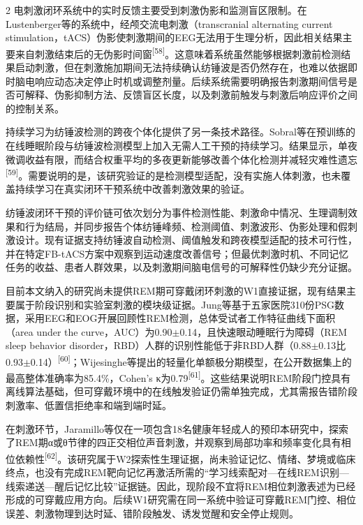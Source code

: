 \documentclass[UTF8,zihao=5,fontset=none]{ctexart}
\newcommand{\hei}{\CJKfamily{hei}}
\newcommand{\leveltwo}[1]{%
  \par\noindent{\hei\fontsize{10.5pt}{12.6pt}\selectfont\mdseries #1\par}}
\newcommand{\refcite}[1]{\nolinebreak[4]\textsuperscript{[#1]}}
\begin{document}
\begin{multicols}{2}
电刺激闭环系统中的实时反馈主要受到刺激伪影和监测盲区限制。在Lustenberger等的系统中，经颅交流电刺激（transcranial alternating current stimulation，tACS）伪影使刺激期间的EEG无法用于生理分析，因此相关结果主要来自刺激结束后的无伪影时间窗\refcite{58}。这意味着系统虽然能够根据刺激前检测结果启动刺激，但在刺激施加期间无法持续确认纺锤波是否仍然存在，也难以依据即时脑电响应动态决定停止时机或调整剂量。后续系统需要明确报告刺激期间信号是否可解释、伪影抑制方法、反馈盲区长度，以及刺激前触发与刺激后响应评价之间的控制关系。\par

持续学习为纺锤波检测的跨夜个体化提供了另一条技术路径。Sobral等在预训练的在线睡眠阶段与纺锤波检测模型上加入无需人工干预的持续学习。结果显示，单夜微调收益有限，而结合权重平均的多夜更新能够改善个体化检测并减轻灾难性遗忘\refcite{59}。需要说明的是，该研究验证的是检测模型适配，没有实施人体刺激，也未覆盖持续学习在真实闭环干预系统中改善刺激效果的验证。\par

纺锤波闭环干预的评价链可依次划分为事件检测性能、刺激命中情况、生理调制效果和行为结局，并同步报告个体纺锤峰频、检测阈值、刺激波形、伪影处理和假刺激设计。现有证据支持纺锤波自动检测、阈值触发和跨夜模型适配的技术可行性，并在特定FB-tACS方案中观察到运动速度改善信号；但最优刺激时机、不同记忆任务的收益、患者人群效果，以及刺激期间脑电信号的可解释性仍缺少充分证据。\par

\leveltwo{4.3 REM检测与相位刺激：证据与可穿戴缺口}

目前本文纳入的研究尚未提供REM期可穿戴闭环刺激的W1直接证据，现有结果主要属于阶段识别和实验室刺激的模块级证据。Jung等基于五家医院310份PSG数据，采用EEG和EOG开展回顾性REM检测，总体受试者工作特征曲线下面积（area under the curve，AUC）为0.90$\pm$0.14，且快速眼动睡眠行为障碍（REM sleep behavior disorder，RBD）人群的识别性能低于非RBD人群（0.88$\pm$0.13比0.93$\pm$0.14）\refcite{60}；Wijesinghe等提出的轻量化单额极分期模型，在公开数据集上的最高整体准确率为85.4\%，Cohen's κ为0.79\refcite{61}。这些结果说明REM阶段门控具有离线算法基础，但可穿戴环境中的在线触发验证仍需单独完成，尤其需报告错阶段刺激率、低置信拒绝率和端到端时延。\par

在刺激环节，Jaramillo等仅在一项包含18名健康年轻成人的预印本研究中，探索了REM期α或θ节律的四正交相位声音刺激，并观察到局部功率和频率变化具有相位依赖性\refcite{62}。该研究属于W2探索性生理证据，尚未验证记忆、情绪、梦境或临床终点，也没有完成REM靶向记忆再激活所需的“学习线索配对—在线REM识别—线索递送—醒后记忆比较”证据链。因此，现阶段不宜将REM相位刺激表述为已经形成的可穿戴应用方向。后续W1研究需在同一系统中验证可穿戴REM门控、相位误差、刺激物理到达时延、错阶段触发、诱发觉醒和安全停止规则。\par


\end{multicols}
\end{document}
